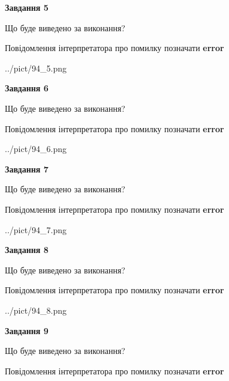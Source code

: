 \documentclass[11pt, ukrainian]{article}
\begin{document}
{\begin {large}
{\begin {center}\textbf{Завдання 5}\end {center}}\par
Що буде виведено за виконання? \par
Повідомлення інтерпретатора про помилку позначати \textbf{error}

\begin{center}
	{../pict/94_5.png}
\end{center}
\newpage

{\begin {center}\textbf{Завдання 6}\end {center}}\par
Що буде виведено за виконання? \par
Повідомлення інтерпретатора про помилку позначати \textbf{error}

\begin{center}
	{../pict/94_6.png}
\end{center}
\newpage

{\begin {center}\textbf{Завдання 7}\end {center}}\par
Що буде виведено за виконання? \par
Повідомлення інтерпретатора про помилку позначати \textbf{error}

\begin{center}
	{../pict/94_7.png}
\end{center}
\newpage

{\begin {center}\textbf{Завдання 8}\end {center}}\par
Що буде виведено за виконання? \par
Повідомлення інтерпретатора про помилку позначати \textbf{error}

\begin{center}
	{../pict/94_8.png}
\end{center}
\newpage

{\begin {center}\textbf{Завдання 9}\end {center}}\par
Що буде виведено за виконання? \par
Повідомлення інтерпретатора про помилку позначати \textbf{error}


\end{large}}
\end{document}
